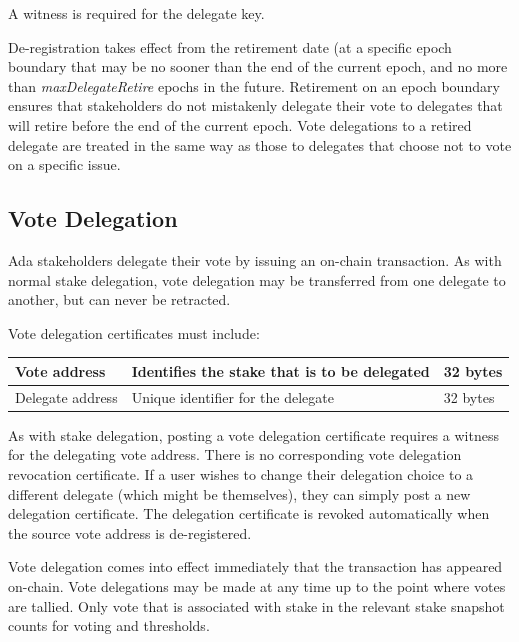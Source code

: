 A witness is required for the delegate key. %

De-registration takes effect from the retirement date (at a specific epoch boundary that may be no sooner than the end of the current epoch, and no more than \emph{maxDelegateRetire} epochs in the future.  Retirement on an epoch boundary ensures that stakeholders do not mistakenly delegate their vote to delegates that will retire before the end of the current epoch.
Vote delegations to a retired delegate are treated in the same way as those to delegates that choose not to vote on a specific issue.

\subsection{Vote Delegation}

Ada stakeholders delegate their vote by issuing an on-chain transaction.  As with normal stake delegation, vote delegation may be transferred from one delegate to another, but can never be retracted.

Vote delegation certificates must include:

\begin{center}
\begin{tabular}{||l|p{3in}|l||}
  \hline\hline
  Vote address & Identifies the stake that is to be delegated  & 32 bytes
  \\\hline
  Delegate address & Unique identifier for the delegate & 32 bytes
  \\\hline
  \hline
\end{tabular}
\end{center}
As with stake delegation, posting a vote delegation certificate requires a witness for the delegating vote address.
There is no corresponding vote delegation revocation certificate. If a user wishes to change their delegation choice to a different delegate (which might be themselves),
they can simply post a new delegation certificate. The delegation certificate is revoked automatically when the source vote address is de-registered.

Vote delegation comes into effect immediately that the transaction has appeared on-chain.  %
Vote delegations may be made at any time up to the point where votes are tallied.
Only vote that is associated with stake in the relevant stake snapshot counts for voting and thresholds.

